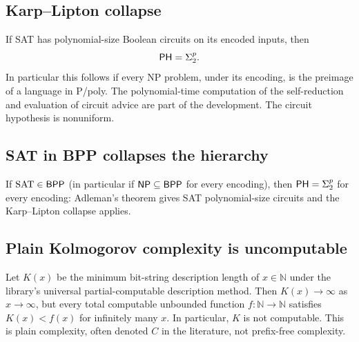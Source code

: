 \begin{result}
\subsection{Karp--Lipton collapse}
If SAT has polynomial-size Boolean circuits on its encoded inputs, then
\[
\mathsf{PH}=\Sigma^p_2.
\]
In particular this follows if every NP problem, under its encoding, is the
preimage of a language in P/poly. The polynomial-time computation of the
self-reduction and evaluation of circuit advice are part of the development.
The circuit hypothesis is nonuniform.\citep{KarpLipton1980}
\end{result}

\begin{result}
\subsection{SAT in BPP collapses the hierarchy}
If $\mathrm{SAT}\in\mathsf{BPP}$ (in particular if $\mathsf{NP}\subseteq\mathsf{BPP}$ for every encoding),
then $\mathsf{PH}=\Sigma^p_2$ for every encoding: Adleman's theorem gives SAT polynomial-size
circuits and the Karp--Lipton collapse applies.\citep{Adleman1978,KarpLipton1980}
\end{result}


\begin{result}
\subsection{Plain Kolmogorov complexity is uncomputable}
Let $K(x)$ be the minimum bit-string description length of $x\in\mathbb N$
under the library's universal partial-computable description method. Then
$K(x)\to\infty$ as $x\to\infty$, but every total computable unbounded function
$f:\mathbb N\to\mathbb N$ satisfies $K(x)<f(x)$ for infinitely many $x$.
In particular, $K$ is not computable. This is plain complexity, often denoted
$C$ in the literature, not prefix-free complexity.\citep{LiVitanyi2019}
\end{result}

